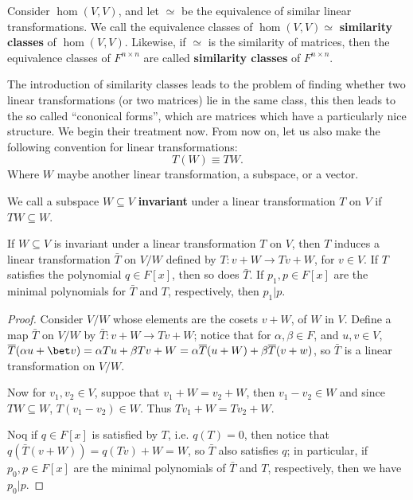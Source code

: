 \begin{definition}
    Consider $\hom{(V,V)}$, and let $\simeq$ be the equivalence of similar
    linear transformations. We call the equivalence classes of
    $\hom{(V,V)}\simeq$ \textbf{similarity classes} of $\hom{(V,V)}$. Likewise,
    if $\simeq$ is the similarity of matrices, then the equivalence
    classes of $F^{n \times n}$ are called \textbf{similarity classes} of
    $F^{n \times n}$.
\end{definition}

The introduction of similarity classes leads to the problem of finding whether
two linear transformations (or two matrices) lie in the same class, this then
leads to the so called ``cononical forms'', which are matrices which have a
particularly nice structure. We begin their treatment now. From now on, let us
also make the following convention for linear transformations:
    \begin{equation*}
        T(W) \equiv TW.
    \end{equation*}
Where $W$ maybe another linear transformation, a subspace, or a vector.

\begin{definition}
    We call a subspace $W \subseteq V$  \textbf{invariant} under a linear
    transformation $T$ on  $V$ if $TW \subseteq W$.
\end{definition}

\begin{lemma}\label{3.4.3}
    If $W \subseteq V$ is invariant under a linear transformation $T$ on  $V$,
    then  $T$ induces a linear transformation  $\bar{T}$ on $V/W$ defined by
    $T:v+W \rightarrow Tv+W$, for $v \in V$. If $T$ satisfies the
    polynomial $q \in F[x]$, then so does $\bar{T}$. If $p_1,p \in F[x]$ are
    the minimal polynomials for $\bar{T}$ and $T$, respectively, then  $p_1|p$.
\end{lemma}
\begin{proof}
    Consider $V/W$ whose elements are the cosets  $v+W$, of  $W$ in  $V$.
    Define a map  $\bar{T}$ on $V/W$ by  $\bar{T}:v+W \rightarrow Tv+W$; notice
    that for $\alpha, \beta \in F$, and  $u,v \in V$, $\bar{T}(\alpha u+\bet
    v)=\alpha Tu+\beta Tv+W=\alpha\bar{T}(u+W)+\beta\bar{T}(v+w)$, so $\bar{T}$
    is a linear transformation on $V/W$.

    Now for  $v_1, v_2 \in V$, suppoe that $v_1+W=v_2+W$, then $v_1-v_2 \in W$
    and since $TW \subseteq W$,  $T(v_1-v_2) \in W$. Thus $Tv_1+W=Tv_2+W$.

    Noq if $q \in F[x]$ is satisfied by $T$, i.e.  $q(T)=0$, then notice that
    $q(\bar{T}(v+W))=q(Tv)+W=W$, so $\bar{T}$ also satisfies $q$; in
    particular, if  $p_0, p \in F[x]$ are the minimal polynomials of $\bar{T}$
    and $T$, respectively, then we have  $p_0|p$.
\end{proof}

